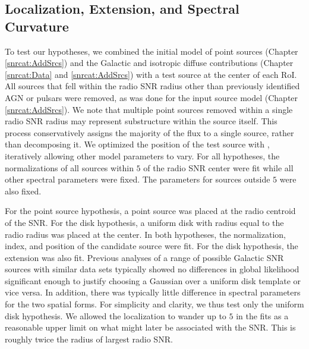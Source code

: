 \subsection{Localization, Extension, and Spectral Curvature}\label{snrcat:LocExtSpec}
To test our hypotheses, we combined the initial model of point sources (Chapter \ref{snrcat:AddSrcs}) and the Galactic and isotropic diffuse contributions (Chapter \ref{snrcat:Data} and \ref{snrcat:AddSrcs}) with a test source at the center of each RoI. All sources that fell within the radio SNR radius other than previously identified AGN or pulsars were removed, as was done for the input source model (Chapter \ref{snrcat:AddSrcs}). We note that multiple point sources removed within a single radio SNR radius may represent substructure within the source itself. This process conservatively assigns the majority of the flux to a single source, rather than decomposing it. We optimized the position of the test source with \ptlike{}, iteratively allowing other model parameters to vary. For all hypotheses, the normalizations of all sources within $5$\degr{} of the radio SNR center were fit while all other spectral parameters were fixed. The parameters for sources outside $5$\degr{} were also fixed.

For the point source hypothesis, a point source was placed at the radio centroid of the SNR. For the disk hypothesis, a uniform disk with radius equal to the radio radius was placed at the center. In both hypotheses, the normalization, index, and position of the candidate source were fit. For the disk hypothesis, the extension was also fit. Previous analyses of a range of possible Galactic SNR sources with similar data sets \citep[e.g.][]{Lande12} typically showed no differences in global likelihood significant enough to justify choosing a Gaussian over a uniform disk template or vice versa. In addition, there was typically little difference in spectral parameters for the two spatial forms. For simplicity and clarity, we thus test only the uniform disk hypothesis. We allowed the localization to wander up to  $5$\degr{} in the fits as a reasonable upper limit on what might later be associated with the SNR. This is roughly twice the radius of largest radio SNR.


